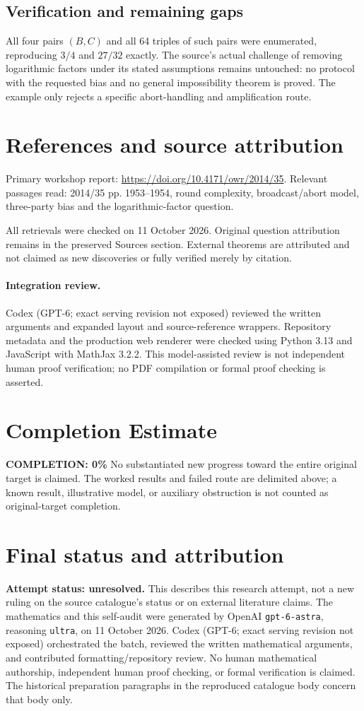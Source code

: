 \documentclass[11pt]{article}
\begin{document}
\subsection{Verification and remaining gaps}
All four pairs $(B,C)$ and all 64 triples of such pairs were enumerated, reproducing $3/4$ and $27/32$ exactly. The source's actual challenge of removing logarithmic factors under its stated assumptions remains untouched: no protocol with the requested bias and no general impossibility theorem is proved. The example only rejects a specific abort-handling and amplification route.

\section{References and source attribution}
Primary workshop report: \url{https://doi.org/10.4171/owr/2014/35}. Relevant passages read: 2014/35 pp. 1953--1954, round complexity, broadcast/abort model, three-party bias and the logarithmic-factor question.

All retrievals were checked on 11 October 2026. Original question attribution remains in the preserved Sources section. External theorems are attributed and not claimed as new discoveries or fully verified merely by citation.


\paragraph{Integration review.} Codex (GPT-6; exact serving revision not exposed) reviewed the written arguments and expanded layout and source-reference wrappers. Repository metadata and the production web renderer were checked using Python 3.13 and JavaScript with MathJax 3.2.2. This model-assisted review is not independent human proof verification; no PDF compilation or formal proof checking is asserted.

\section{Completion Estimate}
\noindent\textbf{COMPLETION: 0\%}
No substantiated new progress toward the entire original target is claimed. The worked results and failed route are delimited above; a known result, illustrative model, or auxiliary obstruction is not counted as original-target completion.

\section{Final status and attribution}
\textbf{Attempt status: unresolved.} This describes this research attempt, not a new ruling on the source catalogue's status or on external literature claims.
The mathematics and this self-audit were generated by OpenAI \texttt{gpt-6-astra}, reasoning \texttt{ultra}, on 11 October 2026. Codex (GPT-6; exact serving revision not exposed) orchestrated the batch, reviewed the written mathematical arguments, and contributed formatting/repository review. No human mathematical authorship, independent human proof checking, or formal verification is claimed. The historical preparation paragraphs in the reproduced catalogue body concern that body only.
\end{document}
